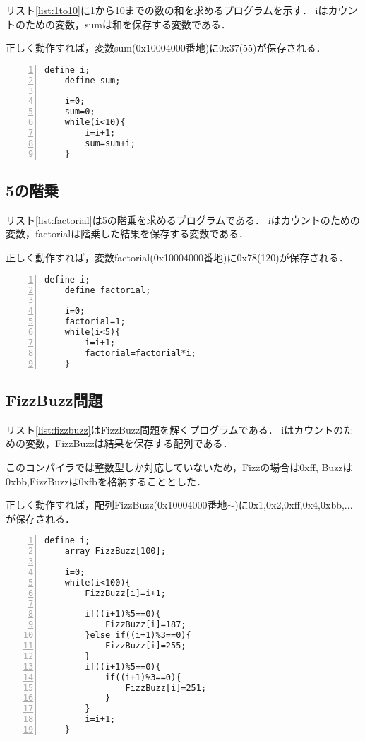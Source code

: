 \documentclass[11pt]{jarticle}
\begin{document}
リスト\ref{list:1to10}に1から10までの数の和を求めるプログラムを示す．
iはカウントのための変数，sumは和を保存する変数である．

正しく動作すれば，変数sum(0x10004000番地)に0x37(55)が保存される．

\begin{lstlisting}[caption=1から10までの数の和,label=list:1to10,numbers=left]
    define i;
    define sum;

    i=0;
    sum=0;
    while(i<10){
        i=i+1;
        sum=sum+i;
    }
\end{lstlisting}

\subsection{5の階乗}

リスト\ref{list:factorial}は5の階乗を求めるプログラムである．
iはカウントのための変数，factorialは階乗した結果を保存する変数である．

正しく動作すれば，変数factorial(0x10004000番地)に0x78(120)が保存される．

\begin{lstlisting}[caption=5の階乗,label=list:factorial,numbers=left]
    define i;
    define factorial;

    i=0;
    factorial=1;
    while(i<5){
        i=i+1;
        factorial=factorial*i;
    }
\end{lstlisting}

\subsection{FizzBuzz問題}

リスト\ref{list:fizzbuzz}はFizzBuzz問題を解くプログラムである．
iはカウントのための変数，FizzBuzzは結果を保存する配列である．

このコンパイラでは整数型しか対応していないため，Fizzの場合は0xff,
Buzzは0xbb,FizzBuzzは0xfbを格納することとした．

正しく動作すれば，配列FizzBuzz(0x10004000番地$\sim$)に0x1,0x2,0xff,0x4,0xbb,...が保存される．

\begin{lstlisting}[caption=FizzBuzz,label=list:fizzbuzz,numbers=left]
    define i;
    array FizzBuzz[100];

    i=0;
    while(i<100){
        FizzBuzz[i]=i+1;

        if((i+1)%5==0){
            FizzBuzz[i]=187;
        }else if((i+1)%3==0){
            FizzBuzz[i]=255;
        }
        if((i+1)%5==0){
            if((i+1)%3==0){
                FizzBuzz[i]=251;
            }
        }
        i=i+1;
    }
\end{lstlisting}
\end{document}
